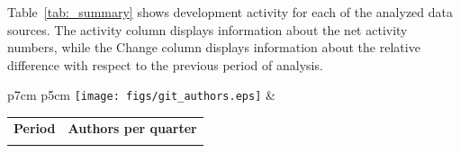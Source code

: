 \documentclass[a4wide,11pt]{report}
\begin{document}
Table~\ref{tab:_summary} shows development activity for each of the analyzed
data sources. The activity column displays information about the net
activity numbers, while the Change column displays information
about the relative difference with respect to the previous period of
analysis.





\begin{tabular}{p{7cm} p{5cm}}
    \vspace{0pt} 
    \texttt{[image: figs/git\_authors.eps]}
    & 
    \vspace{0pt}
    \begin{tabular}{l|r|}%
    \bfseries Period & \bfseries Authors per quarter%
   \csvreader[head to column names]{data/git_authors.csv}{}%
   {\\ & \authors}
   \end{tabular}
  
\end{tabular}





\end{document}
